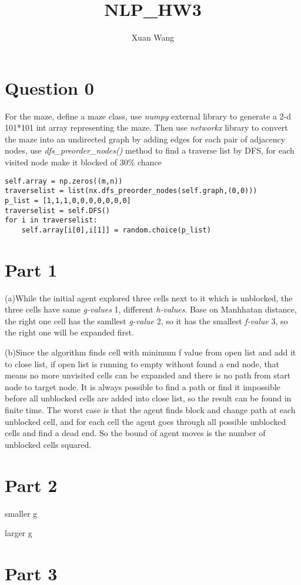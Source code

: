 \documentclass[12pt]{amsart}
\title{NLP_HW3}
\author{Xuan Wang}
\date{} %
\begin{document}
\section{Question 0}
For the maze, define a maze class, use \emph{numpy} external library to generate a 2-d 101*101 int array representing the maze. Then use \emph{networkx} library to convert the maze into an undirected graph by adding edges for each pair of adjacency nodes, use \emph{dfs\_preorder\_nodes()} method to find a traverse list by DFS, for each visited node make it blocked of 30\% chance
\begin{lstlisting}
self.array = np.zeros((m,n))
traverselist = list(nx.dfs_preorder_nodes(self.graph,(0,0)))
p_list = [1,1,1,0,0,0,0,0,0,0]
traverselist = self.DFS()
for i in traverselist:
	self.array[i[0],i[1]] = random.choice(p_list)
\end{lstlisting}

\section{Part 1}
(a)While the initial agent explored three cells next to it which is unblocked, the three cells have same \emph{g-values} 1, different \emph{h-values}. Base on Manhhatan distance, the right one cell has the samllest \emph{g-value} 2, so it has the smallest \emph{f-value} 3, so the right one will be expanded first.

(b)Since the algorithm finds cell with minimum f value from open list and add it to close list, if open list is running to empty without found a end node, that means no more unvisited cells can be expanded and there is no path from start node to target node. It is always possible to find a path or find it impossible before all unblocked cells are added into close list, so the result can be found in finite time. The worst case is that the agent finds block and change path at each unblocked cell, and for each cell the agent goes through all possible unblocked cells and find a dead end. So the bound of agent moves is the number of unblocked cells squared.

\section{Part 2}
smaller g

larger g
\section{Part 3}
\end{document}
